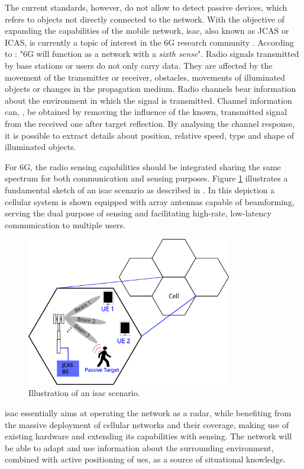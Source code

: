 The current standards, however, do not allow to detect passive devices, which refers to objects not directly connected to the network.
With the objective of expanding the capabilities of the mobile network, \gls{isac}, also known as JCAS or ICAS, is currently a topic of interest in the 6G research community \cite{Mandelli_Henninger_Bauhofer_Wild_2023}.
According to \cite{Viswanathan_Wild_2021}: "6G will function as a network with a \textit{sixth sense}". Radio signals transmitted by base stations or users do not only carry data. They are affected by the movement of the transmitter or receiver, obstacles, movements of illuminated objects or changes in the propagation medium. Radio channels bear information about the environment in which the signal is transmitted. 
Channel information can, \eg, be obtained by removing the influence of the known, transmitted signal from the received one after target reflection. By analysing the channel response, it is possible to extract details about position, relative speed, type and shape of illuminated objects.

For 6G, the radio sensing capabilities should be integrated sharing the same spectrum for both communication and sensing purposes. Figure \ref{fig:isac-scheme-1} illustrates a fundamental sketch of an \gls{isac} scenario as described in \cite{Wild_Grudnitsky_Mandelli_Henninger_Guan_Schaich_2023}. In this depiction a cellular system is shown equipped with array antennas capable of beamforming, serving the dual purpose of sensing and facilitating high-rate, low-latency communication to multiple users.
\begin{figure}[H]
	\centering
	\includegraphics[width=0.8\textwidth]{Images/introduction/isac-scheme-1.png}
	\caption{Illustration of an \gls{isac} scenario.}
	\label{fig:isac-scheme-1}
\end{figure}
\Gls{isac} essentially aims at operating the network as a radar, while benefiting from the massive deployment of cellular networks and their coverage, making use of existing hardware and extending its capabilities with sensing.
The network will be able to adapt and use information about the surrounding environment, combined with active positioning of \glspl{ue}, as a source of situational knowledge.



